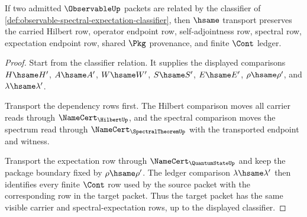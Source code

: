 \begin{theorem}
\label{thm:observable-classifier-stability}
If two admitted $\ObservableUp$ packets are related by the classifier of
\autoref{def:observable-spectral-expectation-classifier}, then $\hsame$
transport preserves the carried Hilbert row, operator endpoint row,
self-adjointness row, spectral row, expectation endpoint row, shared $\Pkg$
provenance, and finite $\Cont$ ledger.
\end{theorem}
\begin{proof}
Start from the classifier relation. It supplies the displayed comparisons
$H\hsame H'$, $A\hsame A'$, $W\hsame W'$, $S\hsame S'$, $E\hsame E'$,
$\rho\hsame\rho'$, and $\lambda\hsame\lambda'$.

Transport the dependency rows first. The Hilbert comparison moves all carrier
reads through $\NameCert_{\HilbertUp}$, and the spectral comparison moves the
spectrum read through $\NameCert_{\SpectralTheoremUp}$ with the transported
endpoint and witness.

Transport the expectation row through $\NameCert_{\QuantumStateUp}$ and keep
the package boundary fixed by $\rho\hsame\rho'$. The ledger comparison
$\lambda\hsame\lambda'$ then identifies every finite $\Cont$ row used by the
source packet with the corresponding row in the target packet. Thus the
target packet has the same visible carrier and spectral-expectation rows, up
to the displayed classifier.
\end{proof}

